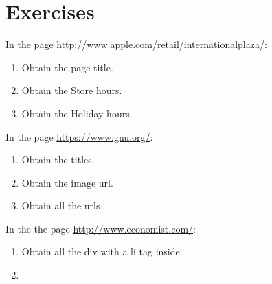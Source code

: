 \section{Exercises}

In the page \url{http://www.apple.com/retail/internationalplaza/}:\\

\begin{enumerate}
\item Obtain the page title.
\item Obtain the Store hours.
\item Obtain the Holiday hours.
\end{enumerate}

In the page \url{https://www.gnu.org/}:\\

\begin{enumerate}
\item Obtain the titles.
\item Obtain the image url.
\item Obtain all the urls
\end{enumerate}

In the the page \url{http://www.economist.com/}:

\begin{enumerate}
\item Obtain all the div with a li tag inside.
\item 
\end{enumerate}

